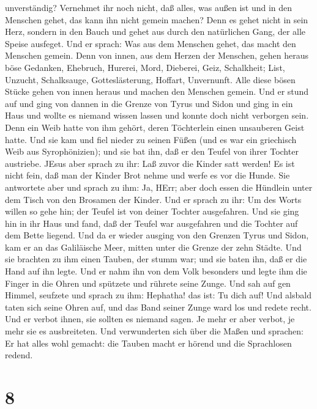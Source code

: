 unverständig? Vernehmet ihr noch nicht, daß alles, was außen ist und in
den Menschen gehet, das kann ihn nicht gemein machen?  Denn
es gehet nicht in sein Herz, sondern in den Bauch und gehet aus durch
den natürlichen Gang, der alle Speise ausfeget.  Und er
sprach: Was aus dem Menschen gehet, das macht den Menschen gemein.
 Denn von innen, aus dem Herzen der Menschen, gehen heraus
böse Gedanken, Ehebruch, Hurerei, Mord,  Dieberei, Geiz,
Schalkheit; List, Unzucht, Schalksauge, Gotteslästerung, Hoffart,
Unvernunft.  Alle diese bösen Stücke gehen von innen heraus
und machen den Menschen gemein.  Und er stund auf und ging
von dannen in die Grenze von Tyrus und Sidon und ging in ein Haus und
wollte es niemand wissen lassen und konnte doch nicht verborgen sein.
 Denn ein Weib hatte von ihm gehört, deren Töchterlein
einen unsauberen Geist hatte. Und sie kam und fiel nieder zu seinen
Füßen  (und es war ein griechisch Weib aus Syrophönizien);
und sie bat ihn, daß er den Teufel von ihrer Tochter austriebe.
 JEsus aber sprach zu ihr: Laß zuvor die Kinder satt
werden! Es ist nicht fein, daß man der Kinder Brot nehme und werfe es
vor die Hunde.  Sie antwortete aber und sprach zu ihm: Ja,
HErr; aber doch essen die Hündlein unter dem Tisch von den Brosamen der
Kinder.  Und er sprach zu ihr: Um des Worts willen so gehe
hin; der Teufel ist von deiner Tochter ausgefahren.  Und
sie ging hin in ihr Haus und fand, daß der Teufel war ausgefahren und
die Tochter auf dem Bette liegend.  Und da er wieder
ausging von den Grenzen Tyrus und Sidon, kam er an das Galiläische Meer,
mitten unter die Grenze der zehn Städte.  Und sie brachten
zu ihm einen Tauben, der stumm war; und sie baten ihn, daß er die Hand
auf ihn legte.  Und er nahm ihn von dem Volk besonders und
legte ihm die Finger in die Ohren und spützete und rührete seine Zunge.
 Und sah auf gen Himmel, seufzete und sprach zu ihm:
Hephatha! das ist: Tu dich auf!  Und alsbald taten sich
seine Ohren auf, und das Band seiner Zunge ward los und redete recht.
 Und er verbot ihnen, sie sollten es niemand sagen. Je mehr
er aber verbot, je mehr sie es ausbreiteten.  Und
verwunderten sich über die Maßen und sprachen: Er hat alles wohl
gemacht: die Tauben macht er hörend und die Sprachlosen redend.

\hypertarget{section-7}{%
\section{8}\label{section-7}}

